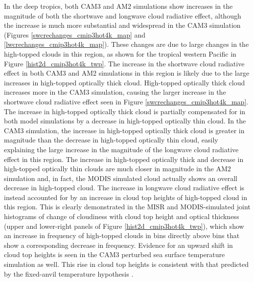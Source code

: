 In the deep tropics, both CAM3 and AM2 simulations show increases in the magnitude of both the shortwave and longwave cloud radiative effect, although the increase is much more substantial and widespread in the CAM3 simulation (Figures \ref{swcrechanges_cmip3hot4k_map} and \ref{lwcrechanges_cmip3hot4k_map}). These changes are due to large changes in the high-topped clouds in this region, as shown for the tropical western Pacific in Figure \ref{hist2d_cmip3hot4k_twp}. The increase in the shortwave cloud radiative effect in both CAM3 and AM2 simulations in this region is likely due to the large increases in high-topped optically thick cloud. High-topped optically thick cloud increases more in the CAM3 simulation, causing the larger increase in the shortwave cloud radiative effect seen in Figure \ref{swcrechanges_cmip3hot4k_map}. The increase in high-topped optically thick cloud is partially compensated for in both model simulations by a decrease in high-topped optically thin cloud. In the CAM3 simulation, the increase in high-topped optically thick cloud is greater in magnitude than the decrease in high-topped optically thin cloud, easily explaining the large increase in the magnitude of the longwave cloud radiative effect in this region. The increase in high-topped optically thick and decrease in high-topped optically thin clouds are much closer in magnitude in the AM2 simulation and, in fact, the MODIS simulated cloud actually shows an overall decrease in high-topped cloud. The increase in longwave cloud radiative effect is instead accounted for by an increase in cloud top heights of high-topped cloud in this region. This is clearly demonstrated in the MISR and MODIS-simulated joint histograms of change of cloudiness with cloud top height and optical thickness (upper and lower-right panels of Figure \ref{hist2d_cmip3hot4k_twp}), which show an increase in frequency of high-topped clouds in bins directly above bins that show a corresponding decrease in frequency. Evidence for an upward shift in cloud top heights is seen in the CAM3 perturbed sea surface temperature simulation as well. This rise in cloud top heights is consistent with that predicted by the fixed-anvil temperature hypothesis \citep{hartmann_and_larson_2002,zelinka_and_hartmann_2010}.

